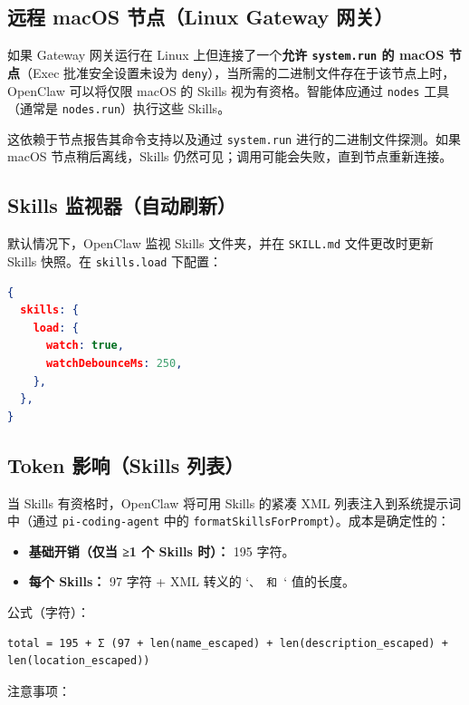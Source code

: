 \subsection{远程 macOS 节点（Linux Gateway 网关）}


如果 Gateway 网关运行在 Linux 上但连接了一个\textbf{允许 \texttt{system.run} 的 macOS 节点}（Exec 批准安全设置未设为 \texttt{deny}），当所需的二进制文件存在于该节点上时，OpenClaw 可以将仅限 macOS 的 Skills 视为有资格。智能体应通过 \texttt{nodes} 工具（通常是 \texttt{nodes.run}）执行这些 Skills。

这依赖于节点报告其命令支持以及通过 \texttt{system.run} 进行的二进制文件探测。如果 macOS 节点稍后离线，Skills 仍然可见；调用可能会失败，直到节点重新连接。

\subsection{Skills 监视器（自动刷新）}


默认情况下，OpenClaw 监视 Skills 文件夹，并在 \texttt{SKILL.md} 文件更改时更新 Skills 快照。在 \texttt{skills.load} 下配置：

\begin{lstlisting}[language=json]
{
  skills: {
    load: {
      watch: true,
      watchDebounceMs: 250,
    },
  },
}
\end{lstlisting}


\subsection{Token 影响（Skills 列表）}


当 Skills 有资格时，OpenClaw 将可用 Skills 的紧凑 XML 列表注入到系统提示词中（通过 \texttt{pi-coding-agent} 中的 \texttt{formatSkillsForPrompt}）。成本是确定性的：

\begin{itemize}
  \item \textbf{基础开销（仅当 ≥1 个 Skills 时）：} 195 字符。
  \item \textbf{每个 Skills：} 97 字符 + XML 转义的 `\texttt{、}\texttt{ 和 }` 值的长度。
\end{itemize}


公式（字符）：

\begin{lstlisting}
total = 195 + Σ (97 + len(name_escaped) + len(description_escaped) + len(location_escaped))
\end{lstlisting}


注意事项：

